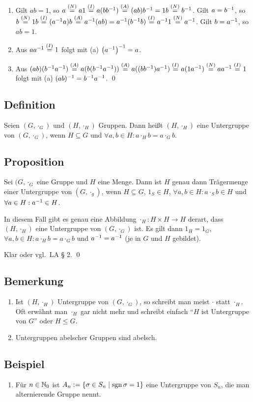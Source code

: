 \bew
\begin{enumerate}[label=(\alph*)]
	\item
		Gilt $ab = 1$, so $a \stackrel{(N)}{=} a1 \stackrel{(I)}{=} a(bb^{-1}) \stackrel{(A)}{=} (ab) b^{-1} = 1b \stackrel{(N)}{=} b^{-1}$. Gilt $a = b^{-1}$, so $b \stackrel{(N)}{=} 1b \stackrel{(I)}{=} (a^{-1} a)b \stackrel{(A)}{=} a^{-1}(ab) = a^{-1}(b^{-1} b) \stackrel{(I)}{=} a^{-1} 1 \stackrel{(N)}{=} a^{-1}$. Gilt $b = a^{-1}$, so $ab = 1$.
		
	\item
		Aus $a a^{-1} \stackrel{(I)}{=} 1$ folgt mit (a) $\left( a^{-1} \right)^{-1} = a$.
		
	\item
		Aus $(ab)(b^{-1} a^{-1}) \stackrel{(A)}{=} a(b(b^{-1} a^{-1})) \stackrel{(A)}{=} a((b b^{-1})a^{-1}) \stackrel{(I)}{=} a(1a^{-1}) \stackrel{(N)}{=} aa^{-1} \stackrel{(I)}{=} 1$ folgt mit (a) $(ab)^{-1} = b^{-1} a^{-1}$. \qed		
\end{enumerate}

\subsection{Definition} Seien $(G, \cdot_G)$ und $(H, \cdot_H)$ Gruppen. Dann heißt $(H, \cdot_H)$ eine Untergruppe von $(G, \cdot_G)$, wenn $H \subseteq G$ und $\forall a, b \in H : a \cdot_H b = a \cdot_G b$.

\subsection{Proposition} Sei $(G, \cdot_G$ eine Gruppe und $H$ eine Menge. Dann ist $H$ genau dann Trägermenge einer Untergruppe von $(G, \cdot_g)$, wenn $H \subseteq G$, $1_S \in H$, $\forall a,b \in H : a \cdot_S b \in H$ und $\forall a \in H : a^ {-1} \in H$.

In diesem Fall gibt es genau eine Abbildung $\cdot_H : H \times H \to H$ derart, dass $(H, \cdot_H)$ eine Untergruppe von $(G, \cdot_G)$ ist. Es gilt dann $1_H = 1_G$, $\forall a,b \in H : a \cdot_H b = a \cdot_G b$ und $a^{-1} = a^{-1}$ (je in $G$ und $H$ gebildet).

\bew Klar oder vgl.\ LA § 2. \qed

\subsection{Bemerkung}
\begin{enumerate}[label=(\alph*)]
	\item
		Ist $(H, \cdot_H)$ Untergruppe von $(G, \cdot_G)$, so schreibt man meist $\cdot$ statt $\cdot_H$. Oft erwähnt man $\cdot_H$ gar nicht mehr und schreibt einfach "`$H$ ist Untergruppe von $G$"' oder $H \leq G$.
		
	\item
		Untergruppen abelscher Gruppen sind abelsch.
\end{enumerate}

\subsection{Beispiel}
\begin{enumerate}[label=(\alph*)]
	\item
		Für $n \in \mathbb N_0$ ist $A_n := \{\sigma \in S_n \mid \operatorname{sgn} \sigma = 1\}$ eine Untergruppe von $S_n$, die man alternierende Gruppe  nennt. 
\end{enumerate}